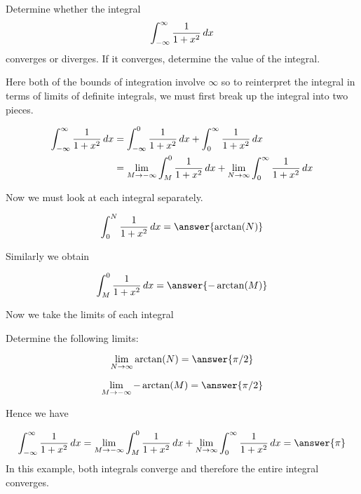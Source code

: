 \documentclass{ximera}
\begin{document}
\begin{example}
Determine whether the integral
\[
\int_{-\infty}^{\infty} \frac{1}{1+x^{2}} \mathop{}\!d x 
\]
converges or diverges. If it converges, determine the value of the integral. 
\begin{explanation}
Here both of the bounds of integration involve $\infty$ so to reinterpret the integral in terms of limits of definite integrals, 
we must first break up the integral into two pieces.

\begin{align*}
\int_{-\infty}^{\infty} \frac{1}{1+x^{2}} \mathop{}\!d x&= \int_{-\infty}^{0} \frac{1}{1+x^{2}} \mathop{}\!d x + \int_{0}^{\infty} \frac{1}{1+x^{2}} \mathop{}\!d x \\
& =\lim_{M \to -\infty} \int_{M}^{0} \frac{1}{1+x^{2}} \mathop{}\!d x + \lim_{N \to \infty} \int_{0}^{\infty} \frac{1}{1+x^{2}} \mathop{}\!d x 
\end{align*}
 
Now we must look at each integral separately. 

\[
\int_{0}^{N} \frac{1}{1+x^2} \d x =  \answer{\arctan(N)}
\]


Similarly we obtain

\[
\int_{M}^{0} \frac{1}{1+x^{2}} \d x= \answer{-\arctan(M)}
\]
 

Now we take the limits of each integral

\begin{question}
Determine the following limits:

 \begin{prompt}
   \[
    \lim_{N\to\infty} \arctan(N) = \answer{\pi/2}
    \]

\[
\lim_{M \to -\infty} -\arctan(M)=\answer{\pi/2}
\]
  \end{prompt}
\end{question}

Hence we have

\[
\int_{-\infty}^{\infty} \frac{1}{1+x^{2}} \d x=\lim_{M \to -\infty} \int_{M}^{0} \frac{1}{1+x^{2}} \d x + \lim_{N \to \infty} \int_{0}^{\infty} \frac{1}{1+x^{2}} \d x =\answer{ \pi}
\]
In this example, both integrals converge and therefore the entire integral converges. 
\end{explanation}
\end{example}
\end{document}
